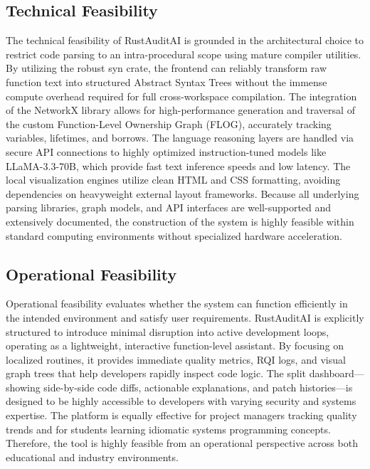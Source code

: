 \subsection{Technical Feasibility}
\hspace{0.5cm}
The technical feasibility of RustAuditAI is grounded in the architectural choice to restrict code parsing to an intra-procedural scope using mature compiler utilities. By utilizing the robust syn crate, the frontend can reliably transform raw function text into structured Abstract Syntax Trees without the immense compute overhead required for full cross-workspace compilation. The integration of the NetworkX library allows for high-performance generation and traversal of the custom Function-Level Ownership Graph (FLOG), accurately tracking variables, lifetimes, and borrows.
The language reasoning layers are handled via secure API connections to highly optimized instruction-tuned models like LLaMA-3.3-70B, which provide fast text inference speeds and low latency. The local visualization engines utilize clean HTML and CSS formatting, avoiding dependencies on heavyweight external layout frameworks. Because all underlying parsing libraries, graph models, and API interfaces are well-supported and extensively documented, the construction of the system is highly feasible within standard computing environments without specialized hardware acceleration.

\subsection{Operational Feasibility}
\hspace{0.5cm}
Operational feasibility evaluates whether the system can function efficiently in the intended environment and satisfy user requirements. RustAuditAI is explicitly structured to introduce minimal disruption into active development loops, operating as a lightweight, interactive function-level assistant. By focusing on localized routines, it provides immediate quality metrics, RQI logs, and visual graph trees that help developers rapidly inspect code logic.
The split dashboard—showing side-by-side code diffs, actionable explanations, and patch histories—is designed to be highly accessible to developers with varying security and systems expertise. The platform is equally effective for project managers tracking quality trends and for students learning idiomatic systems programming concepts. Therefore, the tool is highly feasible from an operational perspective across both educational and industry environments.

